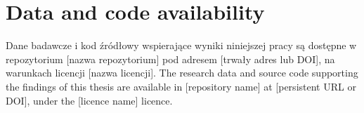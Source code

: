 \cleardoublepage
\chapter*{
                    {Data and code availability}}
{}

\ploren
  {Dane badawcze i kod źródłowy wspierające wyniki niniejszej pracy są dostępne w repozytorium [nazwa repozytorium] pod adresem [trwały adres lub DOI], na warunkach licencji [nazwa licencji].}
  {The research data and source code supporting the findings of this thesis are available in [repository name] at [persistent URL or DOI], under the [licence name] licence.}

